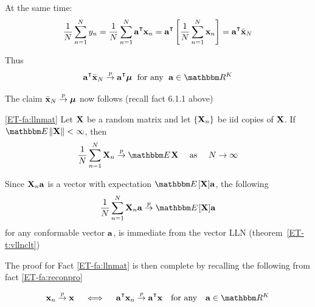 \begin{frame}

    \vspace{2em}
    At the same time:
    \begin{equation*}
        \frac{1}{N} \sum_{n=1}^N y_n 
        = \frac{1}{N} \sum_{n=1}^N \bolda^\T \boldx_n 
        = \bolda^\T \left[ \frac{1}{N} \sum_{n=1}^N  \boldx_n \right]
        = \bolda^\T \bar \boldx_N
    \end{equation*}
    
    \vspace{2em}
    Thus 
    \begin{equation*}
       \bolda^\T \bar \boldx_N \toprob \bolda^\T \boldmu \; \text{ for any }\;
       \bolda \in \RR^K
    \end{equation*}
   
    The claim $\bar {{\mathbf x}}_N \stackrel { p } {\to} {\boldsymbol \mu}$ now follows (recall fact 6.1.1 above)
    
\end{frame}

\begin{frame}

    \vspace{2em}
    \Fact\eqref{ET-fa:llnmat}
    Let $\mathbf X$ be a random matrix and let $\{\mathbf X_n\}$ be
    {\sc iid} copies of $\mathbf X$.  If $\EE \| \boldX \|< \infty$, 
    then
    \begin{equation}
        \frac{1}{N} \sum_{n=1}^N \boldX_n \toprob \EE  \boldX 
         \quad \text{ as } \quad N \to \infty
    \end{equation}
    
    
    \Prf
    Since $\mathbf X_n {\mathbf a}$ is a vector with expectation $\EE [ \boldX ] \bolda $, the following
    $$\frac{1}{N} \sum_{n=1}^N \boldX_n \bolda \toprob \EE [ \boldX] \bolda $$
    for any conformable vector ${\mathbf a}$, is immediate from the vector LLN (theorem~\ref{ET-t:vllnclt})


\end{frame}

\begin{frame}

    \vspace{2em}
    The proof for Fact \ref{ET-fa:llnmat} is then complete by recalling the following from fact \ref{ET-fa:reconpro}
    
    \[\boldx_n \toprob \boldx \quad \iff \quad \bolda^\T \boldx_n \toprob \bolda^\T \boldx \quad \text{for any}\quad \bolda \in \RR^K\]
    
\end{frame}

